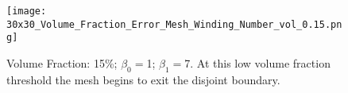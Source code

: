 \begin{figure}
\texttt{[image: 30x30\_Volume\_Fraction\_Error\_Mesh\_Winding\_Number\_vol\_0.15.png]}
\caption{Volume Fraction: 15\%; $\beta_0 = $1; $\beta_1 = $7. At this low volume fraction threshold the mesh begins to exit the disjoint boundary.}
\end{figure}
